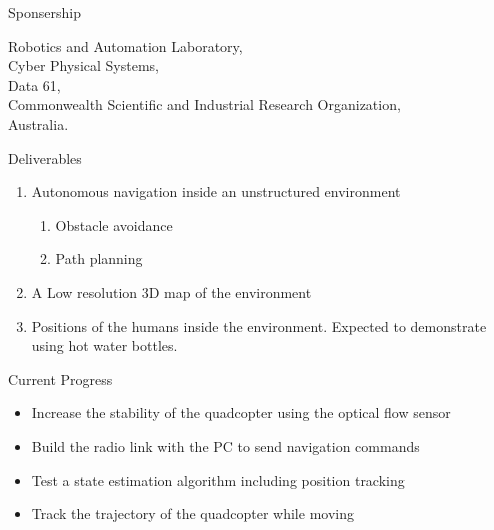 \documentclass[xcolor=table]{beamer}
\begin{document}
\begin{frame}{Sponsership}
 \begin{figure}
    \centering
    \qquad
\end{figure}

\begin{center}
Robotics and Automation Laboratory,\\
Cyber Physical Systems,\\
Data 61,\\
Commonwealth Scientific and Industrial Research Organization,\\
Australia.
\end{center}
\end{frame}

\begin{frame}{Deliverables}
  \begin{enumerate}
  \item Autonomous navigation inside an unstructured environment
    \begin{enumerate}
    \item Obstacle avoidance
    \item Path planning
    \end{enumerate}
  \item A Low resolution 3D map of the environment
  \item Positions of the humans inside the environment. Expected to demonstrate using hot water bottles.
  \end{enumerate}
\end{frame}

\begin{frame}{Current Progress}
\begin{itemize}
\item Increase the stability of the quadcopter using the optical flow sensor
\item Build the radio link with the PC to send navigation commands
\item Test a state estimation algorithm including position tracking
\item Track the trajectory of the quadcopter while moving
\end{itemize}
\end{frame}
\end{document}
